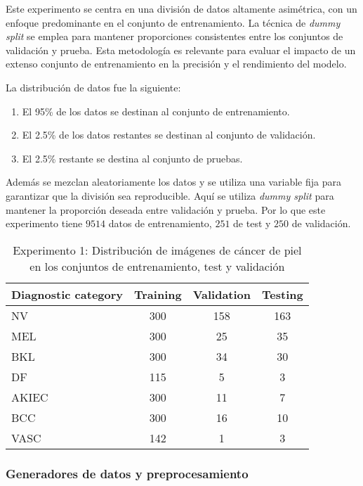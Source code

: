 Este experimento se centra en una división de datos altamente asimétrica, con un enfoque predominante en el conjunto de entrenamiento. La técnica de \textit{dummy split} se emplea para mantener proporciones consistentes entre los conjuntos de validación y prueba. Esta metodología es relevante para evaluar el impacto de un extenso conjunto de entrenamiento en la precisión y el rendimiento del modelo.

   La distribución de datos fue la siguiente:

   \begin{enumerate}
      \item El 95\% de los datos se destinan al conjunto de entrenamiento.
      \item El 2.5\% de los datos restantes se destinan al conjunto de validación.
      \item El 2.5\% restante se destina al conjunto de pruebas.
   \end{enumerate}
   
   Además se mezclan aleatoriamente los datos y se utiliza una variable fija para garantizar que la división sea reproducible. Aquí se utiliza \textit{dummy split} para mantener la proporción deseada entre validación y prueba. Por lo que este experimento tiene $9514$ datos de entrenamiento, $251$ de test y $250$ de validación.

   \begin{table}[ht]
      \centering
      \begin{tabular}{lccc}
      \hline
      \textbf{Diagnostic category} & \textbf{Training} & \textbf{Validation} & \textbf{Testing} \\
      \hline
      NV       & 300 & 158 & 163 \\
      MEL      & 300 & 25  & 35  \\
      BKL      & 300 & 34  & 30  \\
      DF       & 115 & 5   & 3   \\
      AKIEC    & 300 & 11  & 7   \\
      BCC      & 300 & 16  & 10  \\
      VASC     & 142 & 1   & 3   \\ \hline
      \end{tabular}
      \caption{Experimento 1: Distribución de imágenes de cáncer de piel en los conjuntos de entrenamiento, test y validación}
      \label{table:train_test_validate_e1}
      \end{table}
   
\subsubsection*{Generadores de datos y preprocesamiento}

